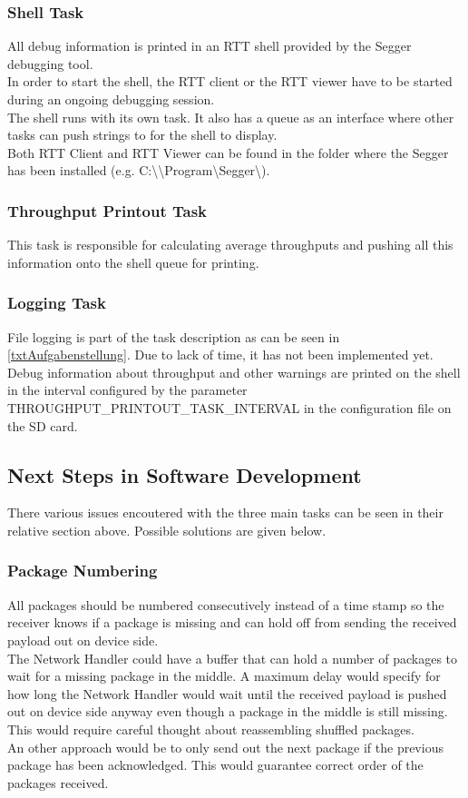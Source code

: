 \subsubsection{Shell Task}
%
All debug information is printed in an RTT shell provided by the Segger debugging tool.\\
In order to start the shell, the RTT client or the RTT viewer have to be started during an ongoing debugging session.\\
The shell runs with its own task. It also has a queue as an interface where other tasks can push strings to for the shell to display.\\
Both RTT Client and RTT Viewer can be found in the folder where the Segger has been installed (e.g. C:\textbackslash \textbackslash Program\textbackslash Segger\textbackslash). 
%
\subsubsection{Throughput Printout Task}
This task is responsible for calculating average throughputs and pushing all this information onto the shell queue for printing.
%
\subsubsection{Logging Task}
File logging is part of the task description as can be seen in \autoref{txtAufgabenstellung}. Due to lack of time, it has not been implemented yet.\\
Debug information about throughput and other warnings are printed on the shell in the interval configured by the parameter THROUGHPUT\_PRINTOUT\_TASK\_INTERVAL in the configuration file on the SD card.
%
%
\subsection{Next Steps in Software Development}%
%
There various issues encoutered with the three main tasks can be seen in their relative section above. Possible solutions are given below.
%
\subsubsection{Package Numbering}
All packages should be numbered consecutively instead of a time stamp so the receiver knows if a package is missing and can hold off from sending the received payload out on device side.\\
The Network Handler could have a buffer that can hold a number of packages to wait for a missing package in the middle. A maximum delay would specify for how long the Network Handler would wait until the received payload is pushed out on device side anyway even though a package in the middle is still missing.\\
This would require careful thought about reassembling shuffled packages.\\
An other approach would be to only send out the next package if the previous package has been acknowledged. This would guarantee correct order of the packages received.
%
